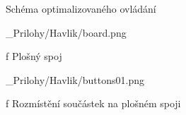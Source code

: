 \app Schéma optimalizovaného ovládání

\medskip {}
\picw=12cm _Prilohy/Havlik/board.png
\caption/f Plošný spoj
\medskip

\medskip
\medskip
\medskip

\medskip {}
\picw=12cm _Prilohy/Havlik/buttons01.png
\caption/f Rozmístění součástek na plošném spoji
\medskip

\par